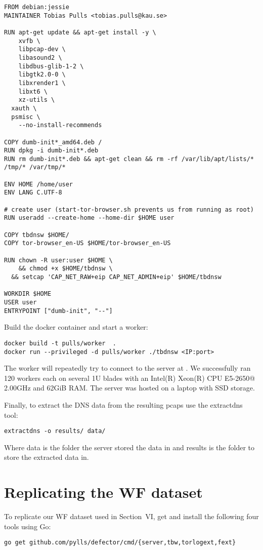 \documentclass{article}
\begin{document}
\begin{lstlisting}
FROM debian:jessie
MAINTAINER Tobias Pulls <tobias.pulls@kau.se>

RUN apt-get update && apt-get install -y \
	xvfb \
	libpcap-dev \
	libasound2 \
	libdbus-glib-1-2 \
	libgtk2.0-0 \
	libxrender1 \
	libxt6 \
	xz-utils \
  xauth \
  psmisc \
	--no-install-recommends

COPY dumb-init*_amd64.deb /
RUN dpkg -i dumb-init*.deb
RUN rm dumb-init*.deb && apt-get clean && rm -rf /var/lib/apt/lists/* /tmp/* /var/tmp/*

ENV HOME /home/user
ENV LANG C.UTF-8

# create user (start-tor-browser.sh prevents us from running as root)
RUN useradd --create-home --home-dir $HOME user

COPY tbdnsw $HOME/
COPY tor-browser_en-US $HOME/tor-browser_en-US

RUN chown -R user:user $HOME \
	&& chmod +x $HOME/tbdnsw \
  && setcap 'CAP_NET_RAW+eip CAP_NET_ADMIN+eip' $HOME/tbdnsw

WORKDIR $HOME
USER user
ENTRYPOINT ["dumb-init", "--"]
\end{lstlisting}

Build the docker container and start a worker:

\begin{lstlisting}
docker build -t pulls/worker  .
docker run --privileged -d pulls/worker ./tbdnsw <IP:port>
\end{lstlisting}
The worker will repeatedly try to connect to the server at {\tt <IP:port>}. We
successfully ran 120 workers each on several 1U blades with an Intel(R) Xeon(R)
CPU E5-2650@ 2.00GHz and 62GiB RAM.
The server was hosted on a laptop with SSD storage.

Finally, to extract the DNS data from the resulting pcaps use the
extractdns tool:

\begin{lstlisting}
extractdns -o results/ data/
\end{lstlisting}
Where data is the folder the server stored the data in and results is the folder
to store the extracted data in.

\section{Replicating the WF dataset}
To replicate our WF dataset used in Section~VI, get and install the following
four tools using Go:
\begin{lstlisting}
go get github.com/pylls/defector/cmd/{server,tbw,torlogext,fext}
\end{lstlisting}
\end{document}
